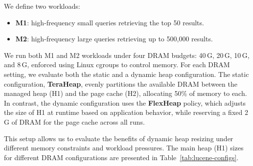 We define two workloads:
\begin{itemize}[leftmargin=1.5em]
  \item \textbf{M1}: high-frequency small queries retrieving the top 50 results.
  \item \textbf{M2}: high-frequency large queries retrieving up to 500{,}000 results.
\end{itemize}

We run both M1 and M2 workloads under four DRAM budgets: 40\,G, 20\,G, 10\,G, and 8\,G,
enforced using Linux cgroups to control memory. 
For each DRAM setting, we evaluate both the static and a dynamic heap configuration. 
The static configuration, \textbf{TeraHeap}, evenly partitions the available DRAM between the 
managed heap (H1) and the page cache (H2), allocating 50\% of memory to each. In contrast, 
the dynamic configuration uses the \textbf{FlexHeap} policy, which adjusts the size of H1 
at runtime based on application behavior, while reserving a fixed 2\,G of DRAM for the page cache across all runs.

This setup allows us to evaluate the benefits of dynamic heap resizing under different memory constraints and workload pressures. 
The main heap (H1) sizes for different DRAM configurations are presented in Table~\ref{tab:lucene-configs}.


